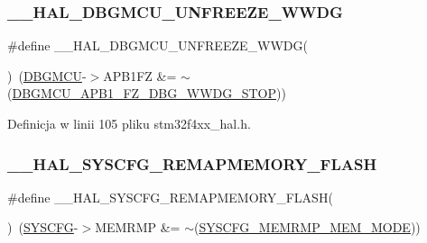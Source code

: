 \subsubsection{\texorpdfstring{\+\_\+\+\_\+\+H\+A\+L\+\_\+\+D\+B\+G\+M\+C\+U\+\_\+\+U\+N\+F\+R\+E\+E\+Z\+E\+\_\+\+W\+W\+DG}{\_\_HAL\_DBGMCU\_UNFREEZE\_WWDG}}
{\footnotesize\ttfamily \#define \+\_\+\+\_\+\+H\+A\+L\+\_\+\+D\+B\+G\+M\+C\+U\+\_\+\+U\+N\+F\+R\+E\+E\+Z\+E\+\_\+\+W\+W\+DG(\begin{DoxyParamCaption}{ }\end{DoxyParamCaption})~(\hyperlink{group___peripheral__declaration_ga92ec6d9ec2251fda7d4ce09748cd74b4}{D\+B\+G\+M\+CU}-\/$>$A\+P\+B1\+FZ \&= $\sim$(\hyperlink{group___peripheral___registers___bits___definition_ga8a49d5e849185d09ee6c7594512ffe88}{D\+B\+G\+M\+C\+U\+\_\+\+A\+P\+B1\+\_\+\+F\+Z\+\_\+\+D\+B\+G\+\_\+\+W\+W\+D\+G\+\_\+\+S\+T\+OP}))}



Definicja w linii 105 pliku stm32f4xx\+\_\+hal.\+h.

\mbox{\label{group___h_a_l___exported___macros_ga9500619e1ec21659bd32b1dfecd5afc1}} 
\subsubsection{\texorpdfstring{\+\_\+\+\_\+\+H\+A\+L\+\_\+\+S\+Y\+S\+C\+F\+G\+\_\+\+R\+E\+M\+A\+P\+M\+E\+M\+O\+R\+Y\+\_\+\+F\+L\+A\+SH}{\_\_HAL\_SYSCFG\_REMAPMEMORY\_FLASH}}
{\footnotesize\ttfamily \#define \+\_\+\+\_\+\+H\+A\+L\+\_\+\+S\+Y\+S\+C\+F\+G\+\_\+\+R\+E\+M\+A\+P\+M\+E\+M\+O\+R\+Y\+\_\+\+F\+L\+A\+SH(\begin{DoxyParamCaption}{ }\end{DoxyParamCaption})~(\hyperlink{group___peripheral__declaration_ga3c833fe1c486cb62250ccbca32899cb8}{S\+Y\+S\+C\+FG}-\/$>$M\+E\+M\+R\+MP \&= $\sim$(\hyperlink{group___peripheral___registers___bits___definition_ga3c05039ec67573c00da29f58b914f258}{S\+Y\+S\+C\+F\+G\+\_\+\+M\+E\+M\+R\+M\+P\+\_\+\+M\+E\+M\+\_\+\+M\+O\+DE}))}



